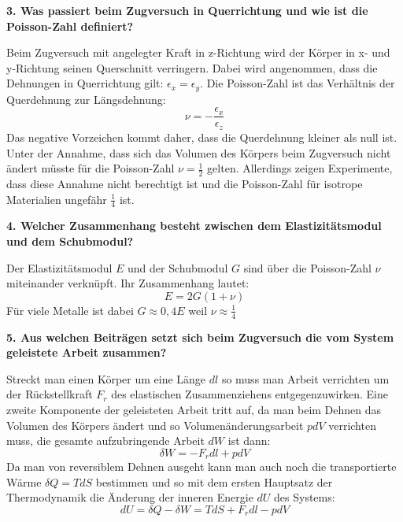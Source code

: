 \noindent\textbf{3. Was passiert beim Zugversuch in Querrichtung und wie ist die Poisson-Zahl definiert?}\\
\begin{addmargin}[25pt]{0pt}
Beim Zugversuch mit angelegter Kraft in z-Richtung wird der Körper in x- und y-Richtung seinen Querschnitt verringern. Dabei wird angenommen, dass die Dehnungen in Querrichtung gilt: $\epsilon_x = \epsilon_y$. Die Poisson-Zahl ist das Verhältnis der Querdehnung zur Längsdehnung:
\begin{equation}\label{eq:Definition_Poisson_Zahl}
\nu = -\frac{\epsilon_x}{\epsilon_z}
\end{equation}
Das negative Vorzeichen kommt daher, dass die Querdehnung kleiner als null ist. Unter der Annahme, dass sich das Volumen des Körpers beim Zugversuch nicht ändert müsste für die Poisson-Zahl $\nu = \frac{1}{2}$ gelten. Allerdings zeigen Experimente, dass diese Annahme nicht berechtigt ist und die Poisson-Zahl für isotrope Materialien ungefähr $\frac{1}{4}$ ist.\\ 
\end{addmargin} 


\noindent\textbf{4. Welcher Zusammenhang besteht zwischen dem Elastizitätsmodul und dem Schubmodul?}\\
\begin{addmargin}[25pt]{0pt}
Der Elastizitätsmodul $E$ und der Schubmodul $G$ sind über die Poisson-Zahl $\nu$ miteinander verknüpft. Ihr Zusammenhang lautet:
\begin{equation}\label{eq:zusammenhang_E_G_nu}
    E = 2G(1+\nu)
\end{equation}
Für viele Metalle ist dabei $G \approx 0,4 E$ weil $\nu \approx \frac{1}{4}$\\
\end{addmargin} 


\noindent\textbf{5. Aus welchen Beiträgen setzt sich beim Zugversuch die vom System geleistete Arbeit zusammen?}\\
\begin{addmargin}[25pt]{0pt}
Streckt man einen Körper um eine Länge $\si{d}l$ so muss man Arbeit verrichten um der Rückstellkraft $F_r$ des elastischen Zusammenziehens entgegenzuwirken. Eine zweite Komponente der geleisteten Arbeit tritt auf, da man beim Dehnen das Volumen des Körpers ändert und so Volumenänderungsarbeit $p\si{d}V$ verrichten muss, die gesamte aufzubringende Arbeit $\si{d}W$ ist dann:
\begin{equation}\label{eq:geleistete_Arbeit_Zugversuch}
    \delta W = -F_r \si{d}l + p\si{d}V
\end{equation}
Da man von reversiblem Dehnen ausgeht kann man auch noch die transportierte Wärme $\delta Q = T\si{d}S$ bestimmen und so mit dem ersten Hauptsatz der Thermodynamik die Änderung der inneren Energie $\si{d}U$ des Systems:
\begin{equation}\label{eq:innere_Energie_Zugversuch}
    \si{d}U = \delta Q - \delta W = T\si{d}S + F_r \si{d}l - p\si{d}V
\end{equation}
\end{addmargin} 


